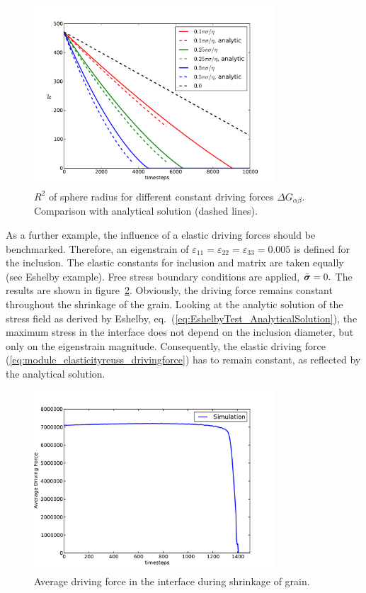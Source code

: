 \begin{figure}[p]
\centering
\includegraphics[width=0.8\textwidth]{Figures/examples/R2DDF.pdf}
\caption{$R^2$ of sphere radius for different constant driving forces $\Delta G_{\alpha\beta}$. Comparison with analytical solution (dashed lines).}
\label{fig:graingrowth_singlegrainsim2}
\end{figure}

As a further example, the influence of a elastic driving forces should be benchmarked. Therefore, an eigenstrain of $\varepsilon_{11}=\varepsilon_{22}=\varepsilon_{33} = 0.005$ is defined for the inclusion. The elastic constants for inclusion and matrix are taken equally (see Eshelby example). Free stress boundary conditions are applied, $\bar{\mbox{\boldmath $\sigma$}} = 0.$ The results are shown in figure~\ref{fig:graingrowth_singlegrainsim3}. Obviously, the driving force remains constant throughout the shrinkage of the grain. Looking at the analytic solution of the stress field as derived by Eshelby, eq.~(\ref{eq:EshelbyTest_AnalyticalSolution}), the maximum stress in the interface does not depend on the inclusion diameter, but only on the eigenstrain magnitude. Consequently, the elastic driving force (\ref{eq:module_elasticityreuss_drivingforce}) has to remain constant, as reflected by the analytical solution.
\begin{figure}
\centering
\includegraphics[width=0.8\textwidth]{Figures/examples/AveragedDF.pdf}
\caption{Average driving force in the interface during shrinkage of grain.}
\label{fig:graingrowth_singlegrainsim3}
\end{figure}

